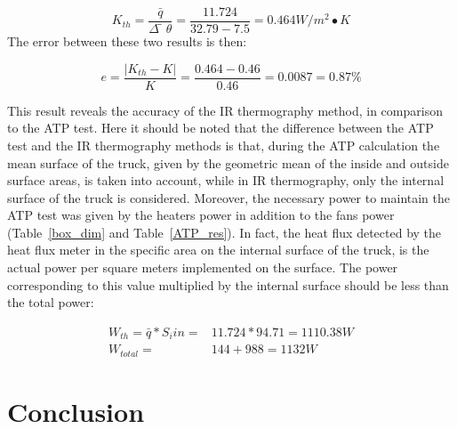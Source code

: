 \documentclass{tQRT2e}
\begin{document}
\begin{equation*}
K_{th}=\frac{\bar{q}}{\Delta ̅\theta} =\frac{11.724}{32.79-7.5}=0.464 W/m^2∙K 
\end{equation*}
The error between these two results is then:

\begin{equation*}
e=  \frac{|K_{th}-K|}{K}=\frac{0.464-0.46}{0.46}=0.0087=0.87\%
\end{equation*}

This result reveals the accuracy of the IR thermography method, in comparison to the ATP test. Here it should be noted that the difference between the ATP test and the IR thermography methods is that, during the ATP calculation the mean surface of the truck, given by the geometric mean of the inside and outside surface areas, is taken into account, while in IR thermography, only the internal surface of the truck is considered. Moreover, the necessary power to maintain the ATP test was given by the heaters power in addition to the fans power (Table~\ref{box_dim} and Table~\ref{ATP_res}). In fact, the heat flux detected by the heat flux meter in the specific area on the internal surface of the truck, is the actual power per square meters implemented on the surface. The power corresponding to this value multiplied by the internal surface should be less than the total power:

\begin{align*}
W_{th}= \bar{q}*S_i{in}=&11.724*94.71=1110.38 W \\
W_{total}= &144 + 988 = 1132 W
\end{align*}


\section{Conclusion}
\end{document}
